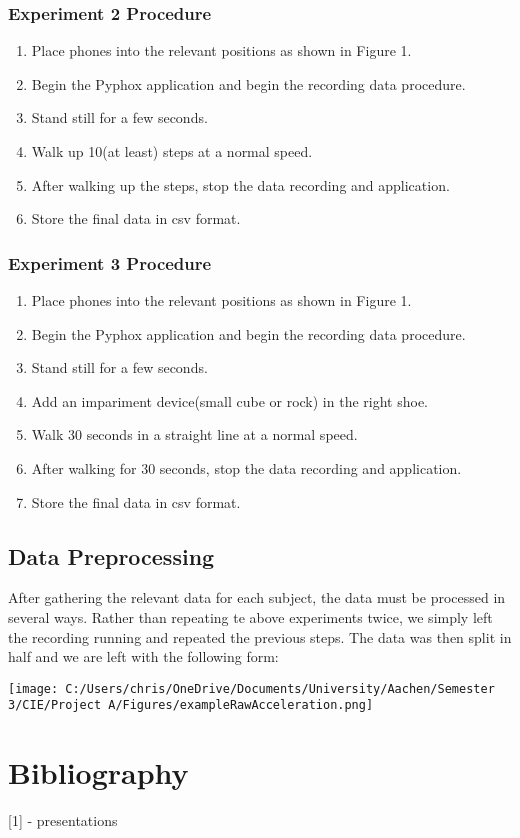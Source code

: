 \documentclass[10pt]{article}
\begin{document}
\subsubsection{Experiment 2 Procedure}
\begin{enumerate}
\item Place phones into the relevant positions as shown in Figure 1.
\item Begin the Pyphox application and begin the recording data procedure.
\item Stand still for a few seconds.
\item Walk up 10(at least) steps at a normal speed.
\item After walking up the steps, stop the data recording and application.
\item Store the final data in csv format.
\end{enumerate}

\subsubsection{Experiment 3 Procedure}
\begin{enumerate}
\item Place phones into the relevant positions as shown in Figure 1.
\item Begin the Pyphox application and begin the recording data procedure.
\item Stand still for a few seconds.
\item Add an impariment device(small cube or rock) in the right shoe.
\item Walk 30 seconds in a straight line at a normal speed.
\item After walking for 30 seconds, stop the data recording and application.
\item Store the final data in csv format.
\end{enumerate}

\subsection{Data Preprocessing}

After gathering the relevant data for each subject, the data must be processed in several ways. Rather than repeating te above experiments twice, we simply left the recording running and repeated the previous steps. The data was then split in half and we are left with the following form:

\begin{center}
\texttt{[image: C:/Users/chris/OneDrive/Documents/University/Aachen/Semester 3/CIE/Project A/Figures/exampleRawAcceleration.png]}
\end{center}



\section{Bibliography}
[1] - presentations
\end{document}
